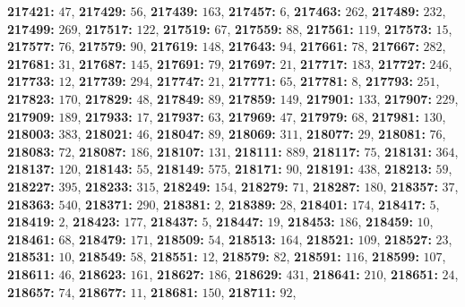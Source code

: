 \textsf{\bfseries 217421:} $47$, \textsf{\bfseries 217429:} $56$, \textsf{\bfseries 217439:} $163$, \textsf{\bfseries 217457:} $6$, \textsf{\bfseries 217463:} $262$, \textsf{\bfseries 217489:} $232$, \textsf{\bfseries 217499:} $269$, \textsf{\bfseries 217517:} $122$, \textsf{\bfseries 217519:} $67$, \textsf{\bfseries 217559:} $88$, \textsf{\bfseries 217561:} $119$, \textsf{\bfseries 217573:} $15$, \textsf{\bfseries 217577:} $76$, \textsf{\bfseries 217579:} $90$, \textsf{\bfseries 217619:} $148$, \textsf{\bfseries 217643:} $94$, \textsf{\bfseries 217661:} $78$, \textsf{\bfseries 217667:} $282$, \textsf{\bfseries 217681:} $31$, \textsf{\bfseries 217687:} $145$, \textsf{\bfseries 217691:} $79$, \textsf{\bfseries 217697:} $21$, \textsf{\bfseries 217717:} $183$, \textsf{\bfseries 217727:} $246$, \textsf{\bfseries 217733:} $12$, \textsf{\bfseries 217739:} $294$, \textsf{\bfseries 217747:} $21$, \textsf{\bfseries 217771:} $65$, \textsf{\bfseries 217781:} $8$, \textsf{\bfseries 217793:} $251$, \textsf{\bfseries 217823:} $170$, \textsf{\bfseries 217829:} $48$, \textsf{\bfseries 217849:} $89$, \textsf{\bfseries 217859:} $149$, \textsf{\bfseries 217901:} $133$, \textsf{\bfseries 217907:} $229$, \textsf{\bfseries 217909:} $189$, \textsf{\bfseries 217933:} $17$, \textsf{\bfseries 217937:} $63$, \textsf{\bfseries 217969:} $47$, \textsf{\bfseries 217979:} $68$, \textsf{\bfseries 217981:} $130$, \textsf{\bfseries 218003:} $383$, \textsf{\bfseries 218021:} $46$, \textsf{\bfseries 218047:} $89$, \textsf{\bfseries 218069:} $311$, \textsf{\bfseries 218077:} $29$, \textsf{\bfseries 218081:} $76$, \textsf{\bfseries 218083:} $72$, \textsf{\bfseries 218087:} $186$, \textsf{\bfseries 218107:} $131$, \textsf{\bfseries 218111:} $889$, \textsf{\bfseries 218117:} $75$, \textsf{\bfseries 218131:} $364$, \textsf{\bfseries 218137:} $120$, \textsf{\bfseries 218143:} $55$, \textsf{\bfseries 218149:} $575$, \textsf{\bfseries 218171:} $90$, \textsf{\bfseries 218191:} $438$, \textsf{\bfseries 218213:} $59$, \textsf{\bfseries 218227:} $395$, \textsf{\bfseries 218233:} $315$, \textsf{\bfseries 218249:} $154$, \textsf{\bfseries 218279:} $71$, \textsf{\bfseries 218287:} $180$, \textsf{\bfseries 218357:} $37$, \textsf{\bfseries 218363:} $540$, \textsf{\bfseries 218371:} $290$, \textsf{\bfseries 218381:} $2$, \textsf{\bfseries 218389:} $28$, \textsf{\bfseries 218401:} $174$, \textsf{\bfseries 218417:} $5$, \textsf{\bfseries 218419:} $2$, \textsf{\bfseries 218423:} $177$, \textsf{\bfseries 218437:} $5$, \textsf{\bfseries 218447:} $19$, \textsf{\bfseries 218453:} $186$, \textsf{\bfseries 218459:} $10$, \textsf{\bfseries 218461:} $68$, \textsf{\bfseries 218479:} $171$, \textsf{\bfseries 218509:} $54$, \textsf{\bfseries 218513:} $164$, \textsf{\bfseries 218521:} $109$, \textsf{\bfseries 218527:} $23$, \textsf{\bfseries 218531:} $10$, \textsf{\bfseries 218549:} $58$, \textsf{\bfseries 218551:} $12$, \textsf{\bfseries 218579:} $82$, \textsf{\bfseries 218591:} $116$, \textsf{\bfseries 218599:} $107$, \textsf{\bfseries 218611:} $46$, \textsf{\bfseries 218623:} $161$, \textsf{\bfseries 218627:} $186$, \textsf{\bfseries 218629:} $431$, \textsf{\bfseries 218641:} $210$, \textsf{\bfseries 218651:} $24$, \textsf{\bfseries 218657:} $74$, \textsf{\bfseries 218677:} $11$, \textsf{\bfseries 218681:} $150$, \textsf{\bfseries 218711:} $92$, 
